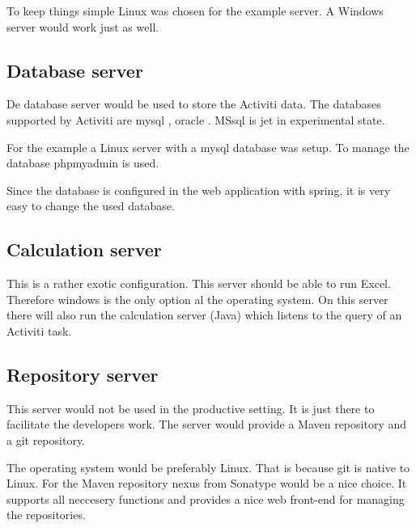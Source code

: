 \documentclass[paper=a4,twoside=false,BCOR=0mm,DIV=calc,fontsize=12pt]{scrartcl}
\begin{document}
To keep things simple Linux was chosen for the example server. A Windows server would work just as well.



\subsection{Database server}
De database server would be used to store the Activiti data. The databases supported by Activiti are mysql \cite{mysql}, oracle \cite{oracledb}. MSsql \cite{mssql} is jet in experimental state.
 
For the example a Linux server with a mysql database was setup.
To manage the database phpmyadmin \cite{phpmyadmin} is used.

Since the database is configured in the web application with spring, it is very easy to change the used database.


\subsection{Calculation server}
This is a rather exotic configuration. This server should be able to run Excel. Therefore windows is the only option al the operating system. On this server there will also run the calculation server (Java) which listens to the query of an Activiti task.



\subsection{Repository server}
This server would not be used in the productive setting. It is just there to facilitate the developers work.
The server would provide a Maven repository and a git repository. 

The operating system would be preferably Linux. That is because git is native to Linux.
For the Maven repository nexus from Sonatype would be a nice choice. It supports all neccesery functions and provides a nice web front-end for managing the repositories.

\end{document}
